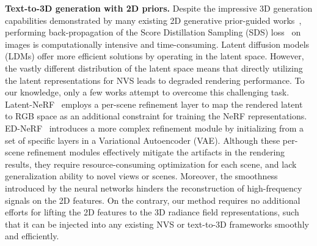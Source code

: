 \textbf{Text-to-3D generation with 2D priors.} Despite the impressive 3D generation capabilities demonstrated by many existing 2D generative prior-guided works~\citep{tang2023dreamgaussian,poole2022dreamfusion,wu2023reconfusion,zhou2024dreamscene360,jain2021dreamfields,text2mesh}, performing back-propagation of the Score Distillation Sampling (SDS) loss~\citep{poole2022dreamfusion} on images is computationally intensive and time-consuming. Latent diffusion models (LDMs) offer more efficient solutions by operating in the latent space. However, the vastly different distribution of the latent space means that directly utilizing the latent representations for NVS leads to degraded rendering performance. To our knowledge, only a few works attempt to overcome this challenging task. Latent-NeRF~\citep{metzer2022latent} employs a per-scene refinement layer to map the rendered latent to RGB space as an additional constraint for training the NeRF representations. ED-NeRF~\citep{park2023ed} introduces a more complex refinement module by initializing from a set of specific layers in a Variational Autoencoder (VAE). Although these per-scene refinement modules effectively mitigate the artifacts in the rendering results, they require resource-consuming optimization for each scene, and lack generalization ability to novel views or scenes. Moreover, the smoothness introduced by the neural networks hinders the reconstruction of high-frequency signals on the 2D features. On the contrary, our method requires no additional efforts for lifting the 2D features to the 3D radiance field representations, such that it can be injected into any existing NVS or text-to-3D frameworks smoothly and efficiently.



  